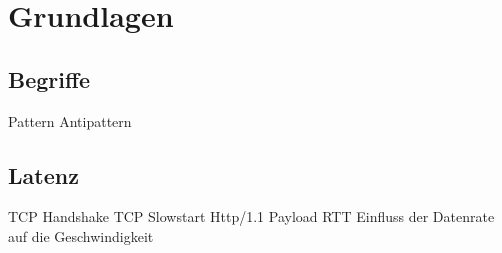 \section{Grundlagen} %
\label{sec:grundlagen}

	\subsection{Begriffe}
	\label{sub:begriffe}
	
	Pattern
	Antipattern
	

	\subsection{Latenz}
	\label{sub:latenz}
		TCP Handshake
		TCP Slowstart
		Http/1.1
		Payload
		RTT
		Einfluss der Datenrate auf die Geschwindigkeit

		

	
